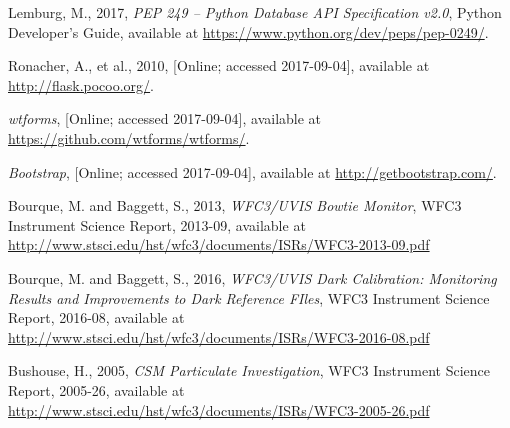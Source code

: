 \documentclass[10pt,journal,compsoc]{IEEEtran}
\begin{document}
\begin{thebibliography}{1}
Lemburg, M., 2017, \emph{PEP 249 -- Python Database API Specification v2.0}, Python Developer's Guide,
available at \textcolor{blue}{\url{https://www.python.org/dev/peps/pep-0249/}}.

Ronacher, A., et al., 2010, [Online; accessed 2017-09-04], available at \textcolor{blue}{\url{http://flask.pocoo.org/}}.

\emph{wtforms}, [Online; accessed 2017-09-04], available at \textcolor{blue}{\url{https://github.com/wtforms/wtforms/}}.

\emph{Bootstrap}, [Online; accessed 2017-09-04], available at \textcolor{blue}{\url{http://getbootstrap.com/}}.

Bourque, M. and Baggett, S., 2013, \emph{WFC3/UVIS Bowtie Monitor}, WFC3 Instrument Science Report, 2013-09,
available at \textcolor{blue}{\url{http://www.stsci.edu/hst/wfc3/documents/ISRs/WFC3-2013-09.pdf}}

Bourque, M. and Baggett, S., 2016, \emph{WFC3/UVIS Dark Calibration: Monitoring Results and Improvements to Dark Reference FIles},
WFC3 Instrument Science Report, 2016-08, available at \textcolor{blue}{\url{http://www.stsci.edu/hst/wfc3/documents/ISRs/WFC3-2016-08.pdf}}

Bushouse, H., 2005, \emph{CSM Particulate Investigation}, WFC3 Instrument Science Report, 2005-26, available
at \textcolor{blue}{\url{http://www.stsci.edu/hst/wfc3/documents/ISRs/WFC3-2005-26.pdf}}

\end{thebibliography}


\end{document}
